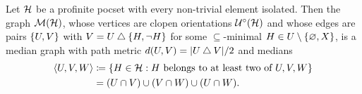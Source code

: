 \documentclass[reqno]{amsart}
\begin{document}
    \begin{proposition}\label{prp:construction_of_dual_median_graph}
        Let $\mathcal{H}$ be a profinite pocset with every non-trivial element isolated. Then the graph $\mathcal{M}(\mathcal{H})$, whose vertices are clopen orientations $\mathcal{U}^\circ(\mathcal{H})$ and whose edges are pairs $\left\{U,V\right\}$ with $V=U\bigtriangleup\left\{H,\lnot H\right\}$ for some $\subseteq$-minimal $H\in U\setminus\left\{\varnothing,X\right\}$, is a median graph with path metric $d(U,V)=|U\bigtriangleup V|/2$ and medians
        \begin{equation*}
            \begin{aligned}
                \left\langle U,V,W\right\rangle&\coloneqq\left\{H\in\mathcal{H}: H\textrm{ belongs to at least two of }U,V,W\right\} \\
                                        &=(U\cap V)\cup(V\cap W)\cup(U\cap W).
            \end{aligned}
        \end{equation*}
    \end{proposition}
\end{document}
